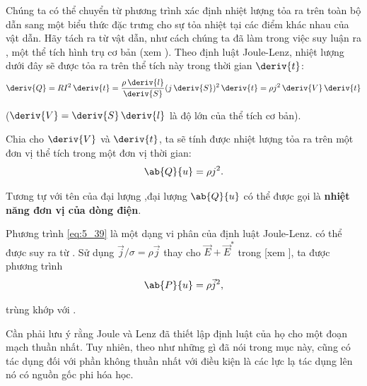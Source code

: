 Chúng ta có thể chuyển từ phương trình xác định nhiệt lượng tỏa ra trên toàn bộ dẫn  sang một biểu thức đặc trưng cho sự tỏa nhiệt tại các điểm khác nhau của vật dẫn. Hãy tách ra từ vật dẫn, như cách chúng ta đã làm trong việc suy luận ra , một thể tích hình trụ cơ bản (xem ). Theo định luật Joule-Lenz, nhiệt lượng dưới đây sẽ được tỏa ra trên thể tích này trong thời gian $\deriv{t}$:
\begin{equation}\label{eq:5_38}
    \deriv{Q} = R I^2\, \deriv{t} = \frac{\rho\, \deriv{l}}{\deriv{S}} (j\, \deriv{S})^2\, \deriv{t} = \rho j^2\, \deriv{V}\, \deriv{t}
\end{equation}

\noindent
($\deriv{V}=\deriv{S}\, \deriv{l}$ là độ lớn của thể tích cơ bản).

Chia  cho $\deriv{V}$ và $\deriv{t}$, ta sẽ tính được nhiệt lượng tỏa ra trên một đơn vị thể tích trong một đơn vị thời gian:
\begin{equation}\label{eq:5_39}
    \ab{Q}{u} = \rho j^2.
\end{equation}

\noindent
Tương tự với tên của đại lượng ,đại lượng $\ab{Q}{u}$ có thể được gọi là \textbf{nhiệt năng đơn vị của dòng điện}.

Phương trình \eqref{eq:5_39} là một dạng vi phân của định luật Joule-Lenz. có thể được suy ra từ . Sử dụng $\vec{j}/\sigma= \rho\vec{j}$ thay cho $\vec{E}+\vec{E}^*$ trong  [xem ], ta được phương trình 
\begin{equation*}
    \ab{P}{u} = \rho \vec{j}^2,
\end{equation*}

\noindent
trùng khớp với .

Cần phải lưu ý rằng Joule và Lenz đã thiết lập định luật của họ cho một đoạn mạch thuần nhất. Tuy nhiên, theo như những gì đã nói trong mục này,  cũng có tác dụng đối với phần không thuần nhất với điều kiện là các lực lạ tác dụng lên nó có nguồn gốc phi hóa học.

